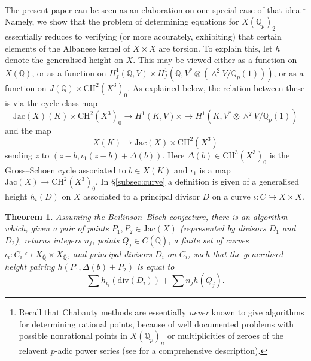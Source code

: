 \documentclass[11pt]{amsart}
\def\Q{\mathbb Q}
\newcommand{\divv}{\mathrm{div}}
\theoremstyle{plain}
\newtheorem{theorem}{Theorem}
\theoremstyle{definition}
\newcommand{\Jac}{\mathrm{Jac}}
\newcommand{\CH}{\mathrm{CH}}
\begin{document}
The present paper can be seen as an elaboration on one special case of that idea.\footnote{Recall that Chabauty methods are essentially \textit{never} known to give algorithms for determining rational points, because of well documented problems with possible nonrational points in $X(\Q _p )_n $ or multiplicities of zeroes of the relavent $p$-adic power series (see \cite{BS10} for a comprehensive description).} Namely, we show that the problem of determining equations for $X(\Q _p )_2 $ essentially reduces to verifying (or more accurately, exhibiting) that certain elements of the Albanese kernel of $X\times X$ are torsion. To explain this, let $h$ denote the generalised height on $X$. This may be viewed either as a function on $X(\Q )$, or as a function on $H^1 _f (\Q ,V)\times H^1 _f (\Q ,V^* \otimes (\wedge ^2 V/\Q _p (1)))$, or as a function on $J(\Q )\times \CH ^2 (X^3 )_0$. As explained below, the relation between these is via the cycle class map
\[
\Jac (X)(K)\times \CH ^2 (X^3 )_0 \to H^1 (K,V)\times \to H^1 (K,V^* \otimes \wedge ^2 V/\Q _p (1))
\]
and the map
\[
X(K)\to \Jac (X)\times \CH ^2 (X^3 )
\]
sending $z$ to $(z-b,\iota _1 (z-b)+\Delta (b))$. Here $\Delta (b)\in \CH ^3 (X^3 )_0$ is the Gross--Schoen cycle associated to $b\in X(K)$ and $\iota _1 $ is a map $\Jac (X)\to \CH ^2 (X^3 )_0$. In \S \ref{subsec:curve} a definition is given of a generalised height $h_{\iota }(D)$ on $X$ associated to a principal divisor $D$ on a curve $\iota :C \hookrightarrow X\times X$. 
\begin{theorem}\label{thm:only_one}
Assuming the Beilinson--Bloch conjecture, there is an algorithm which, given a pair of points $P_1 , P_2 \in \Jac (X)$ (represented by divisors $D_1 $ and $D_2$), returns integers $n_j $, points $Q_j \in C(\overline{\Q })$, a finite set of curves $\iota _i :C_i \hookrightarrow X_{\overline{\Q }}\times X_{\overline{\Q }}$, and principal divisors $D_i $ on $C_i$, such that the generalised height pairing $h(P_1 ,\Delta (b)+P_2 )$ is equal to
\[
\sum h_{\iota _i }(\divv (D_i ))+\sum n_j h(Q_j ).
\]
\end{theorem}
%
%
\end{document}
